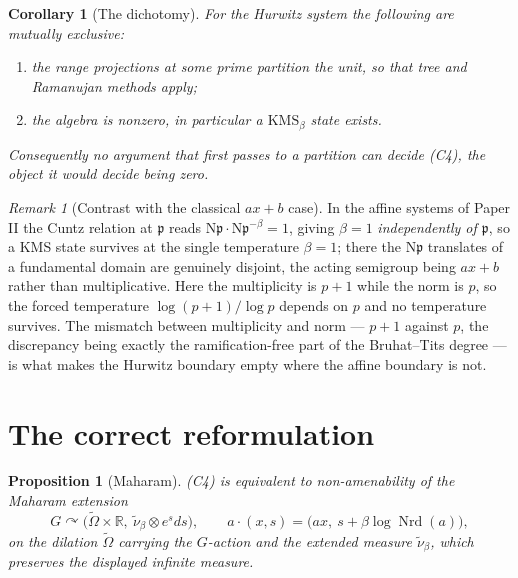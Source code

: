 \documentclass[11pt]{amsart}
\numberwithin{equation}{section}
\newtheorem{proposition}[theorem]{Proposition}
\newtheorem{corollary}[theorem]{Corollary}
\theoremstyle{definition}
\theoremstyle{remark}
\newtheorem{remark}[theorem]{Remark}
\newcommand{\R}{\mathbb{R}}
\newcommand{\Nrd}{\operatorname{Nrd}}
\newcommand{\Ns}{\mathrm{N}}
\newcommand{\pp}{\mathfrak{p}}
\begin{document}
\begin{corollary}[The dichotomy]\label{cor:dichotomy}
For the Hurwitz system the following are mutually exclusive:
\begin{enumerate}
\item the range projections at some prime partition the unit, so that tree and
Ramanujan methods apply;
\item the algebra is nonzero, in particular a $\mathrm{KMS}_\beta$ state exists.
\end{enumerate}
Consequently no argument that first passes to a partition can decide (C4), the object it
would decide being zero.
\end{corollary}

\begin{remark}[Contrast with the classical $ax+b$ case]\label{rem:contrast}
In the affine systems of Paper II the Cuntz relation at $\pp$ reads
$\Ns\pp\cdot\Ns\pp^{-\beta}=1$, giving $\beta=1$ \emph{independently of $\pp$}, so a KMS state
survives at the single temperature $\beta=1$; there the $\Ns\pp$ translates of a fundamental
domain are genuinely disjoint, the acting semigroup being $ax+b$ rather than
multiplicative. Here the multiplicity is $p+1$ while the norm
is $p$, so the forced temperature $\log(p+1)/\log p$ depends on $p$ and no temperature
survives. The mismatch between multiplicity and norm --- $p+1$ against $p$, the discrepancy
being exactly the ramification-free part of the Bruhat--Tits degree --- is what makes the
Hurwitz boundary empty where the affine boundary is not.
\end{remark}

\section{The correct reformulation}

\begin{proposition}[Maharam]\label{prop:maharam}
(C4) is equivalent to non-amenability of the Maharam extension \cite{Maharam}
\[
G\curvearrowright\bigl(\widetilde\Omega\times\R,\ \tilde\nu_\beta\otimes e^{s}ds\bigr),
\qquad a\cdot(x,s)=\bigl(ax,\ s+\beta\log\Nrd(a)\bigr),
\]
on the dilation $\widetilde\Omega$ carrying the $G$-action and the extended measure
$\tilde\nu_\beta$, which \emph{preserves} the displayed infinite measure.
\end{proposition}
\end{document}
